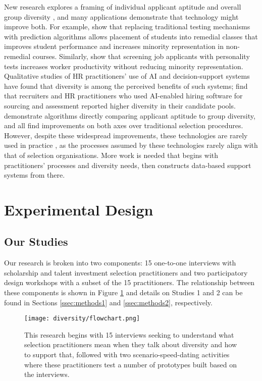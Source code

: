 New research explores a framing of individual applicant aptitude and overall group diversity \cite{noray2023systemic}, and many applications demonstrate that technology might improve both. For example, \textcite{bergman2021seven} show that replacing traditional testing mechanisms with prediction algorithms allows placement of students into remedial classes that improves student performance and increases minority representation in non-remedial courses. Similarly, \textcite{autor2008does} show that screening job applicants with personality tests increases worker productivity without reducing minority representation. Qualitative studies of HR practitioners' use of AI and decision-support systems have found that diversity is among the perceived benefits of such systems; \textcite{li2021algorithmic} find that recruiters and HR practitioners who used AI-enabled hiring software for sourcing and assessment reported higher diversity in their candidate pools.  \textcite{huppenkothen2020entrofy,kleinberg2018algorithmic,schumann_diverse_2019} demonstrate algorithms directly comparing applicant aptitude to group diversity, and all find improvements on both axes over traditional selection procedures. However, despite these widespread improvements, these technologies are rarely used in practice \cite{page_diversity_2017}, as the processes assumed by these technologies rarely align with that of selection organisations. More work is needed that begins with practitioners' processes and diversity needs, then constructs data-based support systems from there.

\section{Experimental Design}\label{sec:methods}
\subsection{Our Studies}
Our research is broken into two components: 15 one-to-one interviews with scholarship and talent investment selection practitioners and two participatory design workshops with a subset of the 15 practitioners. The relationship between these components is shown in Figure \ref{fig:flowchart} and details on Studies 1 and 2 can be found in Sections \ref{ssec:methods1} and \ref{ssec:methods2}, respectively.

\begin{figure}[htbp]
    \centering
    \texttt{[image: diversity/flowchart.png]}
    \caption{This research begins with 15 interviews seeking to understand what selection practitioners mean when they talk about diversity and how to support that, followed with two scenario-speed-dating activities where these practitioners test a number of prototypes built based on the interviews.}
    \label{fig:flowchart}
\end{figure}

